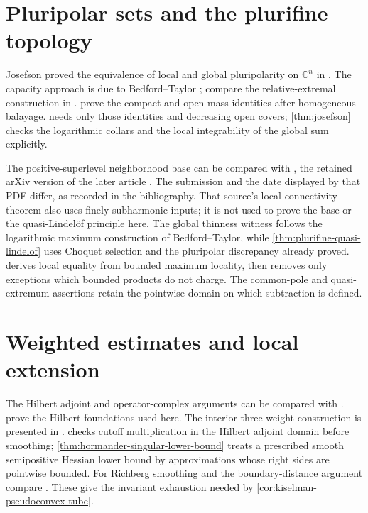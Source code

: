 \section{Pluripolar sets and the plurifine topology}
\label{sec:history-pluripolar}
Josefson proved the equivalence of local and global pluripolarity on $\mathbb C^n$ in \cite{Jos78}. The capacity approach is due to Bedford--Taylor \cite{BT82}; compare the relative-extremal construction in \cite[Theorem 4.32, pp.~118--119, Theorem 4.34, pp.~119--121, and Theorem 4.40 and Corollary 4.41, pp.~124--125]{GZ17}.  prove the compact and open mass identities after homogeneous balayage.  needs only those identities and decreasing open covers; \cref{thm:josefson} checks the logarithmic collars and the local integrability of the global sum explicitly.

The positive-superlevel neighborhood base can be compared with \cite[Lemma 3.1, pp.~3--4]{EMW05Plurifine}, the retained arXiv version of the later article \cite{EMW06}. The submission and the date displayed by that PDF differ, as recorded in the bibliography. That source's local-connectivity theorem also uses finely subharmonic inputs; it is not used to prove the base or the quasi-Lindel\"of principle here. The global thinness witness follows the logarithmic maximum construction of Bedford--Taylor, while \cref{thm:plurifine-quasi-lindelof} uses Choquet selection and the pluripolar discrepancy already proved.  derives local equality from bounded maximum locality, then removes only exceptions which bounded products do not charge. The common-pole and quasi-extremum assertions retain the pointwise domain on which subtraction is defined.

\section{Weighted estimates and local extension}
\label{sec:history-weighted-extension}
The Hilbert adjoint and operator-complex arguments can be compared with \cite[Chapter VIII, Section 1, pp.~363--365]{DemBook}.  prove the Hilbert foundations used here. The interior three-weight construction is presented in \cite[Lemma 7.2, Proposition 7.3 and Theorem 7.1, pp.~35--39]{Blo14SCV}.  checks cutoff multiplication in the Hilbert adjoint domain before smoothing; \cref{thm:hormander-singular-lower-bound} treats a prescribed smooth semipositive Hessian lower bound by approximations whose right sides are pointwise bounded. For Richberg smoothing and the boundary-distance argument compare \cite[Chapter I, (5.18)--(5.21), pp.~43--44, and (7.1)--(7.2), pp.~53--55]{DemBook}. These give the invariant exhaustion needed by \cref{cor:kiselman-pseudoconvex-tube}.


